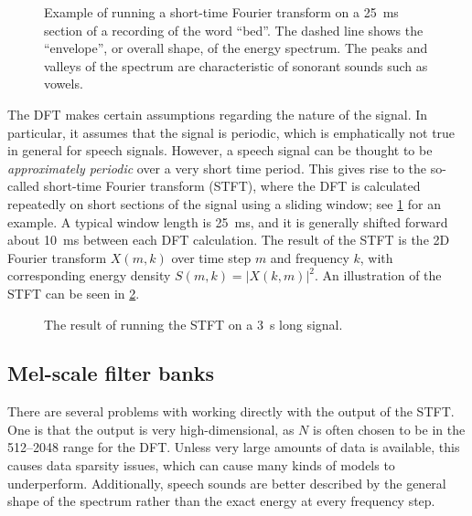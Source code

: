 
\begin{figure}
  \centering
  
  \caption{\label{fig:sftf}Example of running a short-time Fourier transform on a \SI{25}{\ms} section of a recording of the word ``bed''.
  The dashed line shows the ``envelope'', or overall shape, of the energy spectrum.
  The peaks and valleys of the spectrum are characteristic of sonorant sounds such as vowels.}
\end{figure}

The DFT makes certain assumptions regarding the nature of the signal.
In particular, it assumes that the signal is periodic, which is emphatically not true in general for speech signals.
However, a speech signal can be thought to be \emph{approximately periodic} over a very short time period.
This gives rise to the so-called short-time Fourier transform (STFT), where the DFT is calculated repeatedly on short sections of the signal using a sliding window; see \cref{fig:sftf} for an example.
A typical window length is \SI{25}{\ms}, and it is generally shifted forward about \SI{10}{\ms} between each DFT calculation.
The result of the STFT is the 2D Fourier transform $X(m,k)$ over time step $m$ and frequency $k$, with corresponding energy density $S(m,k) = \left|X(k,m)\right|^2$.
An illustration of the STFT can be seen in \cref{fig:spectrogram}.

\begin{figure}
  \centering

  \caption{\label{fig:spectrogram}The result of running the STFT on a \SI{3}{\s} long signal.}
\end{figure}

\subsection{Mel-scale filter banks}

There are several problems with working directly with the output of the STFT. One is that the output is very high-dimensional, as $N$ is often chosen to be in the \numrange{512}{2048} range for the DFT.
Unless very large amounts of data is available, this causes data sparsity issues, which can cause many kinds of models to underperform.
Additionally, speech sounds are better described by the general shape of the spectrum rather than the exact energy at every frequency step.

